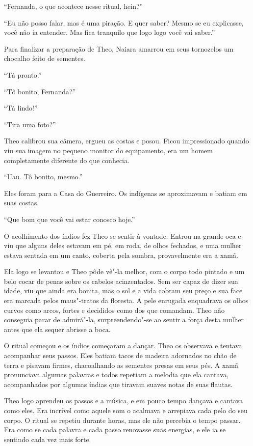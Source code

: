 ``Fernanda, o que acontece nesse ritual, hein?''

``Eu não posso falar, mas é uma piração. E quer saber? Mesmo se eu
explicasse, você não ia entender. Mas fica tranquilo que logo logo você
vai saber.''

Para finalizar a preparação de Theo, Naiara amarrou em seus tornozelos
um chocalho feito de sementes.

``Tá pronto.''

``Tô bonito, Fernanda?''

``Tá lindo!''

``Tira uma foto?''

Theo calibrou sua câmera, ergueu as costas e posou. Ficou impressionado
quando viu sua imagem no pequeno monitor do equipamento, era um homem
completamente diferente do que conhecia.

``Uau. Tô bonito, mesmo.''

Eles foram para a Casa do Guerreiro. Os indígenas se aproximavam e
batiam em suas costas.

``Que bom que você vai estar conosco hoje.''

O acolhimento dos índios fez Theo se sentir à vontade. Entrou na
grande oca e viu que alguns deles estavam em pé, em roda, de olhos
fechados, e uma mulher estava sentada em um canto, coberta pela sombra,
provavelmente era a xamã.

Ela logo se levantou e Theo pôde vê"-la melhor, com o corpo todo pintado
e um belo cocar de penas sobre os cabelos acinzentados. Sem ser capaz de
dizer sua idade, viu que ainda era bonita, mas o sol e a vida cobram seu
preço e sua face era marcada pelos maus"-tratos da floresta. A pele
enrugada enquadrava os olhos curvos como arcos, fortes e decididos como
dos que comandam. Theo não conseguia parar de admirá"-la,
surpreendendo"-se ao sentir a força desta mulher antes que ela sequer
abrisse a boca.

O ritual começou e os índios começaram a dançar. Theo os observava e
tentava acompanhar seus passos. Eles batiam tacos de madeira adornados
no chão de terra e pisavam firmes, chacoalhando as sementes presas em
seus pés. A xamã pronunciava algumas palavras e todos repetiam a melodia
que ela cantava, acompanhados por algumas índias que tiravam suaves
notas de suas flautas.

Theo logo aprendeu os passos e a música, e em pouco tempo dançava e
cantava como eles. Era incrível como aquele som o acalmava e arrepiava
cada pelo do seu corpo. O ritual se repetiu durante horas, mas ele não
percebia o tempo passar. Era como se cada palavra e cada passo renovasse
suas energias, e ele ia se sentindo cada vez mais forte.

